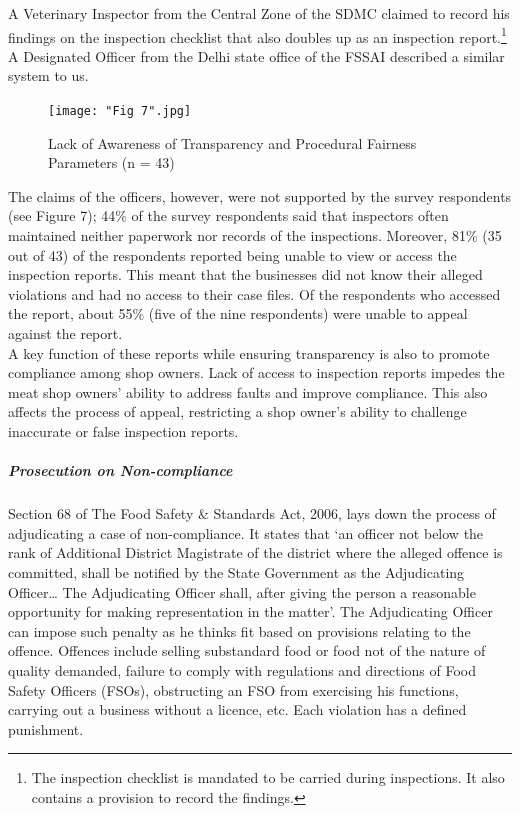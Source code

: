\documentclass[a4paper, 12pt, twoside]{article}
\begin{document}
A Veterinary Inspector from the Central Zone of the SDMC claimed to record his findings on the inspection checklist that also doubles up as an inspection report.\footnote{The inspection checklist is mandated to be carried during inspections. It also contains a provision to record the findings.} A Designated Officer from the Delhi state office of the FSSAI described a similar system to us.

\begin{figure}[H]
\centering
\texttt{[image: "Fig 7".jpg]}
\captionsetup{justification=centering}\caption[Optional Caption]{Lack of Awareness of Transparency and Procedural Fairness Parameters \newline (n = 43)\footnotemark}
\end{figure} 

The claims of the officers, however, were not supported by the survey respondents (see Figure 7); 44\% of the survey respondents said that inspectors often maintained neither paperwork nor records of the inspections. Moreover, 81\% (35 out of 43) of the respondents reported being unable to view or access the inspection reports. This meant that the businesses did not know their alleged violations and had no access to their case files. Of the respondents who accessed the report, about 55\% (five of the nine respondents) were unable to appeal against the report. \\

A key function of these reports while ensuring transparency is also to promote compliance among shop owners. Lack of access to inspection reports impedes the meat shop owners’ ability to address faults and improve compliance. This also affects the process of appeal, restricting a shop owner’s ability to challenge inaccurate or false inspection reports.\\

\subparagraph{Prosecution on Non-compliance}

Section 68 of The Food Safety \& Standards Act, 2006, lays down the process of adjudicating a case of non-compliance. It states that ‘an officer not below the rank of Additional District Magistrate of the district where the alleged offence is committed, shall be notified by the State Government as the Adjudicating Officer… The Adjudicating Officer shall, after giving the person a reasonable opportunity for making representation in the matter’. The Adjudicating Officer can impose such penalty as he thinks fit based on provisions relating to the offence. Offences include selling substandard food or food not of the nature of quality demanded, failure to comply with regulations and directions of Food Safety Officers (FSOs), obstructing an FSO from exercising his functions, carrying out a business without a licence, etc. Each violation has a defined punishment.\\
\end{document}
